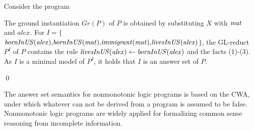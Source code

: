 \begin{example}
Consider the program \\
{\small {}}
            
\normalsize
{\smallskip

\noindent            
The ground instantiation $Gr(P)$ of $P$ is obtained by substituting $X$ with $\mathit{mat}$ and ${alex}$. For $I{=}\{${\small$\mathit{bornInUS(alex){,}bornInUS(mat){,}immigrant(mat){,}livesInUS(alex)}$}$\}$, the GL-reduct $P^I$ of $P$ contains the rule $\mathit{livesInUS(alex)\leftarrow bornInUS(alex)}$ and the facts (1)-(3). As $I$ is a minimal model of $P^I$, it holds that $I$ is an answer set of $P$.}\qed
\end{example}
\normalsize
The answer set semantics for nonmonotonic logic programs is based on the CWA, under which whatever can not be derived from a program is assumed to be false. Nonmonotonic logic programs are widely applied for formalizing common sense reasoning from incomplete information.



